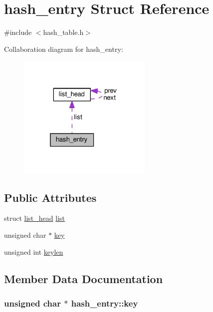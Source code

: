 \hypertarget{structhash__entry}{}\section{hash\+\_\+entry Struct Reference}
\label{structhash__entry}


{\ttfamily \#include $<$hash\+\_\+table.\+h$>$}



Collaboration diagram for hash\+\_\+entry\+:\nopagebreak
\begin{figure}[H]
\begin{center}
\leavevmode
\includegraphics[width=181pt]{structhash__entry__coll__graph}
\end{center}
\end{figure}
\subsection*{Public Attributes}
\begin{DoxyCompactItemize}
\item 
struct \hyperlink{structlist__head}{list\+\_\+head} \hyperlink{structhash__entry_ada52d1b11e544cd19b58007cc3713069}{list}
\item 
unsigned char $\ast$ \hyperlink{structhash__entry_a0c23748b9dddd5f11b1ff9dbcbd47e9c}{key}
\item 
unsigned int \hyperlink{structhash__entry_a6f87c5657a590b7a848cc3f9a1d30d13}{keylen}
\end{DoxyCompactItemize}


\subsection{Member Data Documentation}
\subsubsection[{\texorpdfstring{key}{key}}]{\setlength{\rightskip}{0pt plus 5cm}unsigned char $\ast$ hash\+\_\+entry\+::key}\hypertarget{structhash__entry_a0c23748b9dddd5f11b1ff9dbcbd47e9c}{}\label{structhash__entry_a0c23748b9dddd5f11b1ff9dbcbd47e9c}
